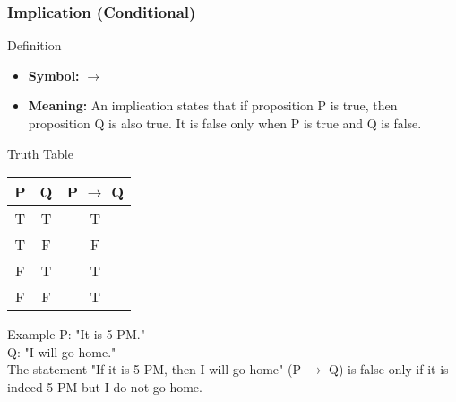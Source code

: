 \documentclass[aspectratio=169]{beamer}
\begin{document}
\begin{frame}[fragile]
    \frametitle{Implication (Conditional)}
    \begin{block}{Definition}
        \begin{itemize}
            \item \textbf{Symbol:} $\rightarrow$
            \item \textbf{Meaning:} An implication states that if proposition P is true, then proposition Q is also true. It is false only when P is true and Q is false.
        \end{itemize}
    \end{block}
    \begin{block}{Truth Table}
        \begin{center}
            \begin{tabular}{|c|c|c|}
                \hline
                P & Q & P $\rightarrow$ Q \\
                \hline
                T & T & T \\
                T & F & F \\
                F & T & T \\
                F & F & T \\
                \hline
            \end{tabular}
        \end{center}
    \end{block}
    \begin{block}{Example}
        P: "It is 5 PM." \\
        Q: "I will go home." \\
        The statement "If it is 5 PM, then I will go home" (P $\rightarrow$ Q) is false only if it is indeed 5 PM but I do not go home.
    \end{block}
\end{frame}
\end{document}
